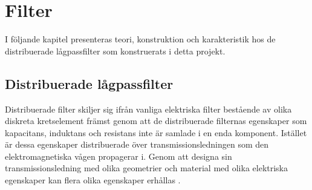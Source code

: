 \documentclass[main.tex]{subfiles}
\begin{document}
\chapter{Filter}
\label{ch:filter}
I följande kapitel presenteras teori, konstruktion och karakteristik hos de distribuerade lågpassfilter som konstruerats i detta projekt.



\section{Distribuerade lågpassfilter}
Distribuerade filter skiljer sig ifrån vanliga elektriska filter bestående av olika diskreta kretselement främst genom att de distribuerade filternas egenskaper som kapacitans, induktans och resistans inte är samlade i en enda komponent. Istället är dessa egenskaper distribuerade över transmissionsledningen som den elektromagnetiska vågen propagerar i. Genom att designa sin transmissionsledning med olika geometrier och material med olika elektriska egenskaper kan flera olika egenskaper erhållas \cite{cheng}. 
\end{document}
